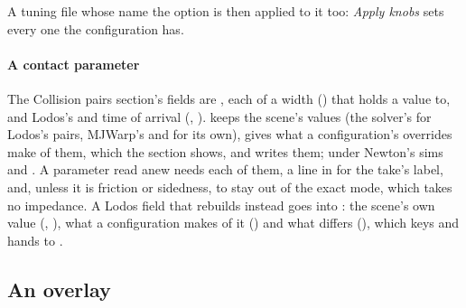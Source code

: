 A tuning file whose  name the option is then applied to it too: \emph{Apply knobs} sets every one the configuration has.

\paragraph{A contact parameter} The Collision pairs section's fields are , each of a width () that  holds a value to, and Lodos's  and time of arrival (, ).  keeps the scene's values (the solver's  for Lodos's pairs, MJWarp's  and  for its own),  gives what a configuration's overrides make of them, which the section shows, and  writes them; under Newton's sims  and . A parameter read anew needs each of them, a line in  for the take's label, and, unless it is friction or sidedness, to stay out of the exact mode, which takes no impedance. A Lodos field that rebuilds instead goes into : the scene's own value (, ), what a configuration makes of it () and what differs (), which  keys and  hands to .

\subsection{An overlay}\label{sec:newoverlay}

